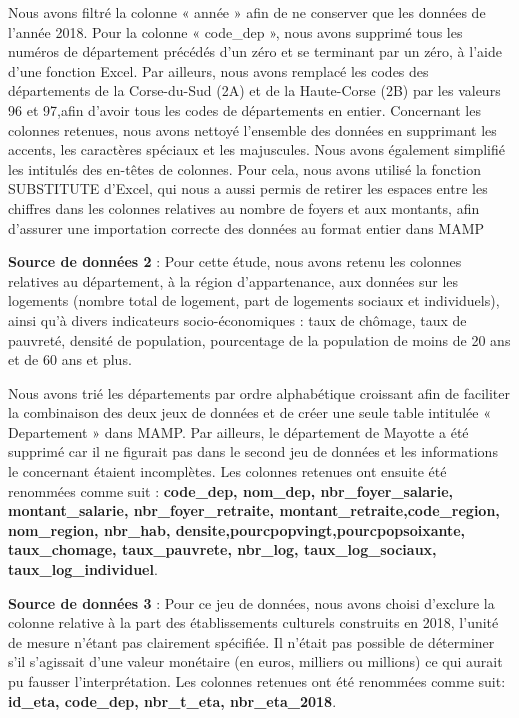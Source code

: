 \documentclass[mstat,12pt]{unswthesis}
\begin{document}
\medskip

Nous avons filtré la colonne « année » afin de ne conserver que les
données de l'année 2018. Pour la colonne « code\_dep », nous avons
supprimé tous les numéros de département précédés d'un zéro et se
terminant par un zéro, à l'aide d'une fonction Excel. Par ailleurs, nous
avons remplacé les codes des départements de la Corse-du-Sud (2A) et de
la Haute-Corse (2B) par les valeurs 96 et 97,afin d'avoir tous les codes
de départements en entier. Concernant les colonnes retenues, nous avons
nettoyé l'ensemble des données en supprimant les accents, les caractères
spéciaux et les majuscules. Nous avons également simplifié les intitulés
des en-têtes de colonnes. Pour cela, nous avons utilisé la fonction
SUBSTITUTE d'Excel, qui nous a aussi permis de retirer les espaces entre
les chiffres dans les colonnes relatives au nombre de foyers et aux
montants, afin d'assurer une importation correcte des données au format
entier dans MAMP

\bigskip

\textbf{Source de données 2} : Pour cette étude, nous avons retenu les
colonnes relatives au département, à la région d'appartenance, aux
données sur les logements (nombre total de logement, part de logements
sociaux et individuels), ainsi qu'à divers indicateurs socio-économiques
: taux de chômage, taux de pauvreté, densité de population, pourcentage
de la population de moins de 20 ans et de 60 ans et plus.

\medskip

Nous avons trié les départements par ordre alphabétique croissant afin
de faciliter la combinaison des deux jeux de données et de créer une
seule table intitulée « Departement » dans MAMP. Par ailleurs, le
département de Mayotte a été supprimé car il ne figurait pas dans le
second jeu de données et les informations le concernant étaient
incomplètes. Les colonnes retenues ont ensuite été renommées comme suit
: \textbf{code\_dep, nom\_dep, nbr\_foyer\_salarie, montant\_salarie,
nbr\_foyer\_retraite, montant\_retraite,code\_region, nom\_region,
nbr\_hab, densite,pourcpopvingt,pourcpopsoixante, taux\_chomage,
taux\_pauvrete, nbr\_log, taux\_log\_sociaux, taux\_log\_individuel}.

\bigskip

\textbf{Source de données 3} : Pour ce jeu de données, nous avons choisi
d'exclure la colonne relative à la part des établissements culturels
construits en 2018, l'unité de mesure n'étant pas clairement spécifiée.
Il n'était pas possible de déterminer s'il s'agissait d'une valeur
monétaire (en euros, milliers ou millions) ce qui aurait pu fausser
l'interprétation. Les colonnes retenues ont été renommées comme suit:
\textbf{id\_eta, code\_dep, nbr\_t\_eta, nbr\_eta\_2018}.
\end{document}
